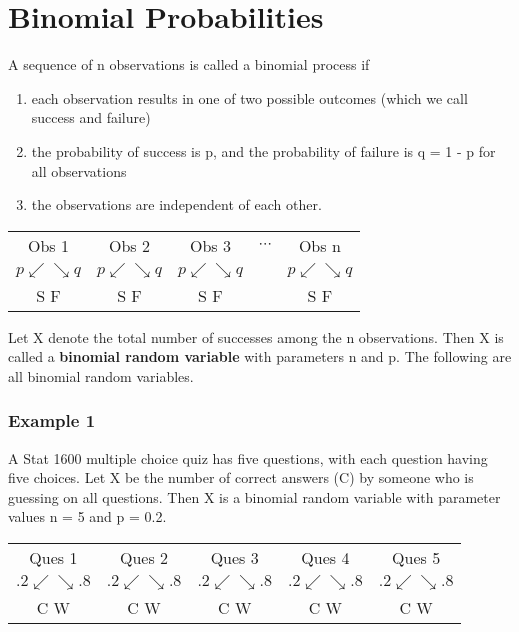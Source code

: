 \documentclass[11pt]{book}\usepackage[]{graphicx}\usepackage[]{color}
\begin{document}
\section{Binomial Probabilities}

A sequence of n observations is called a binomial process if

\begin{enumerate}
\item each observation results in one of two possible outcomes (which we call    success and failure)
\item the probability of success is p, and the probability of failure is q = 1 - p for all observations
\item the observations are independent of each other.
\end{enumerate}

\begin{center}
\begin{tabular}{@{} ccccc @{}} \hline
Obs 1 & Obs 2 & Obs 3 & $\cdots$ & Obs n \\
$p \swarrow  \searrow q$ & $p \swarrow  \searrow q$ & $p \swarrow  \searrow q$ & & $p \swarrow  \searrow q$ \\
S \hspace{3mm}   F & S  \hspace{3mm}  F &  S  \hspace{3mm}  F &  & S \hspace{3mm}   F \\ \hline
\end{tabular}
\end{center}

Let X denote the total number of successes among the n observations.  Then
X is called a \textbf{binomial random variable}  with parameters n and p. The following are all binomial random variables.

\subsubsection{Example 1} A Stat 1600 multiple choice quiz has five questions, with each question having five choices.  Let X be the number of correct answers (C) by someone who is guessing on all questions.  Then X is a binomial random variable with parameter values n = 5 and p = 0.2.

\begin{center}
\begin{tabular}{@{} ccccc @{}} \hline
Ques 1 & Ques 2 & Ques 3 & Ques 4 & Ques 5 \\
$.2 \swarrow  \searrow .8$ & $.2 \swarrow  \searrow .8$ & $.2 \swarrow  \searrow .8$ & $.2 \swarrow  \searrow .8$ & $.2 \swarrow  \searrow .8$ \\
C \hspace{3mm} W & C  \hspace{3mm}  W &  C  \hspace{3mm}  W &   C \hspace{3mm} W & C \hspace{3mm}   W \\ \hline
\end{tabular}
\end{center}
\end{document}

